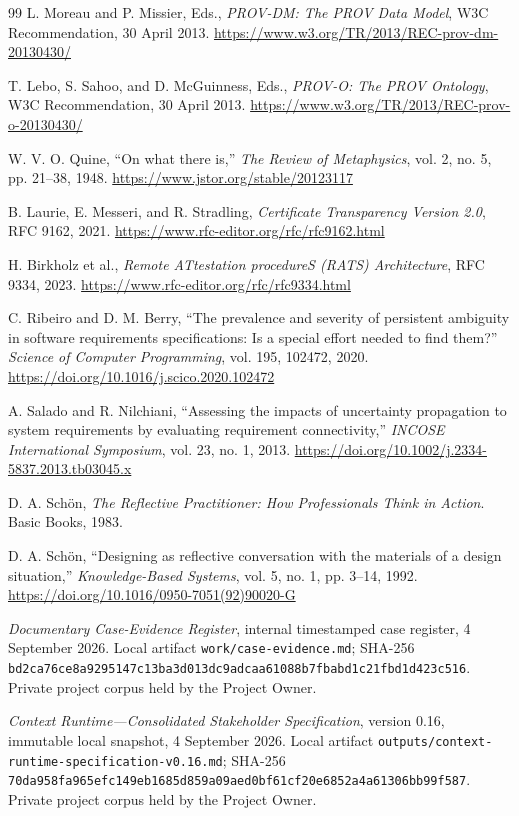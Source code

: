 \documentclass[10pt,a4paper]{article}
\begin{document}
\begin{thebibliography}{99}
L. Moreau and P. Missier, Eds., \emph{PROV-DM: The PROV Data Model}, W3C Recommendation, 30 April 2013. \url{https://www.w3.org/TR/2013/REC-prov-dm-20130430/}

T. Lebo, S. Sahoo, and D. McGuinness, Eds., \emph{PROV-O: The PROV Ontology}, W3C Recommendation, 30 April 2013. \url{https://www.w3.org/TR/2013/REC-prov-o-20130430/}

W. V. O. Quine, ``On what there is,'' \emph{The Review of Metaphysics}, vol. 2, no. 5, pp. 21--38, 1948. \url{https://www.jstor.org/stable/20123117}

B. Laurie, E. Messeri, and R. Stradling, \emph{Certificate Transparency Version 2.0}, RFC 9162, 2021. \url{https://www.rfc-editor.org/rfc/rfc9162.html}

H. Birkholz et al., \emph{Remote ATtestation procedureS (RATS) Architecture}, RFC 9334, 2023. \url{https://www.rfc-editor.org/rfc/rfc9334.html}

C. Ribeiro and D. M. Berry, ``The prevalence and severity of persistent ambiguity in software requirements specifications: Is a special effort needed to find them?'' \emph{Science of Computer Programming}, vol. 195, 102472, 2020. \url{https://doi.org/10.1016/j.scico.2020.102472}

A. Salado and R. Nilchiani, ``Assessing the impacts of uncertainty propagation to system requirements by evaluating requirement connectivity,'' \emph{INCOSE International Symposium}, vol. 23, no. 1, 2013. \url{https://doi.org/10.1002/j.2334-5837.2013.tb03045.x}

D. A. Sch\"on, \emph{The Reflective Practitioner: How Professionals Think in Action}. Basic Books, 1983.

D. A. Sch\"on, ``Designing as reflective conversation with the materials of a design situation,'' \emph{Knowledge-Based Systems}, vol. 5, no. 1, pp. 3--14, 1992. \url{https://doi.org/10.1016/0950-7051(92)90020-G}

\emph{Documentary Case-Evidence Register}, internal timestamped case register, 4 September 2026. Local artifact \nolinkurl{work/case-evidence.md}; SHA-256 \nolinkurl{bd2ca76ce8a9295147c13ba3d013dc9adcaa61088b7fbabd1c21fbd1d423c516}. Private project corpus held by the Project Owner.

\emph{Context Runtime---Consolidated Stakeholder Specification}, version 0.16, immutable local snapshot, 4 September 2026. Local artifact \nolinkurl{outputs/context-runtime-specification-v0.16.md}; SHA-256 \nolinkurl{70da958fa965efc149eb1685d859a09aed0bf61cf20e6852a4a61306bb99f587}. Private project corpus held by the Project Owner.


\end{thebibliography}
\end{document}
